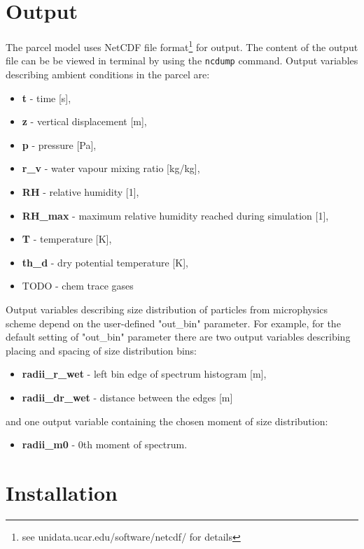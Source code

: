 \documentclass[11pt]{article}
\newcommand{\prog}[1]{{\tt#1}}
\begin{document}
\section{Output}

The parcel model uses NetCDF file format\footnote{see unidata.ucar.edu/software/netcdf/ for details} for output.
The content of the output file can be be viewed in terminal by using the \prog{ncdump} command.
Output variables describing ambient conditions in the parcel are:

\begin{itemize}
  \item \textbf{t} - time [s],
  \item \textbf{z} - vertical displacement [m],
  \item \textbf{p} - pressure [Pa],
  \item \textbf{r\_v} - water vapour mixing ratio [kg/kg],
  \item \textbf{RH} - relative humidity [1],
  \item \textbf{RH\_{max}} - maximum relative humidity reached during simulation [1],
  \item \textbf{T} - temperature [K],
  \item \textbf{th\_d} - dry potential temperature [K],
  \item TODO - chem trace gases
\end{itemize}

\noindent
Output variables describing size distribution of particles from microphysics scheme depend 
  on the user-defined "out\_bin" parameter.
For example, for the default setting of "out\_bin" parameter there are two output variables 
  describing placing and spacing of size distribution bins:

\begin{itemize}
  \item \textbf{radii\_r\_wet} - left bin edge of spectrum histogram [m],
  \item \textbf{radii\_dr\_wet} - distance between the edges [m]
\end{itemize}

and one output variable containing the chosen  moment of size distribution:
\begin{itemize}
  \item \textbf{radii\_m0} - 0th moment of spectrum.
\end{itemize}

\section{Installation}
\end{document}
